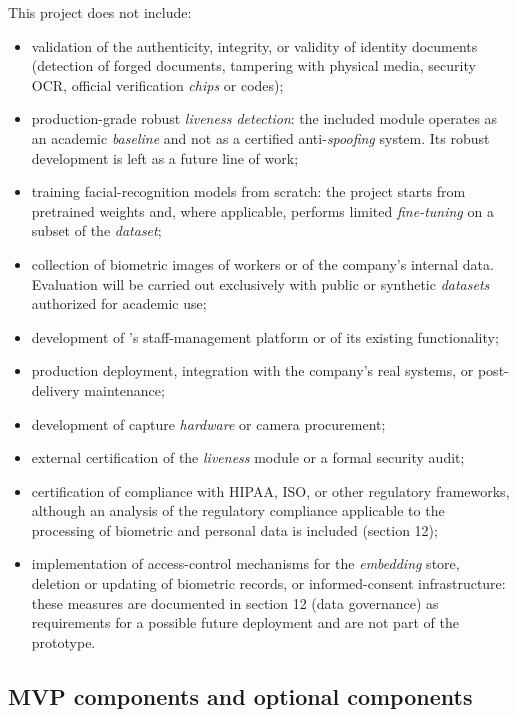 \documentclass[
  11pt, %
]{charter}
\begin{document}
This project does not include:

\begin{itemize}
  \item validation of the authenticity, integrity, or validity of identity documents (detection of forged documents, tampering with physical media, security OCR, official verification \textit{chips} or codes);
  \item production-grade robust \textit{liveness detection}: the included module operates as an academic \textit{baseline} and not as a certified anti-\textit{spoofing} system. Its robust development is left as a future line of work;
  \item training facial-recognition models from scratch: the project starts from pretrained weights and, where applicable, performs limited \textit{fine-tuning} on a subset of the \textit{dataset};
  \item collection of biometric images of workers or of the company's internal data. Evaluation will be carried out exclusively with public or synthetic \textit{datasets} authorized for academic use;
  \item development of \empclientename's\hspace{1px} staff-management platform or of its existing functionality;
  \item production deployment, integration with the company's real systems, or post-delivery maintenance;
  \item development of capture \textit{hardware} or camera procurement;
  \item external certification of the \textit{liveness} module or a formal security audit;
  \item certification of compliance with HIPAA, ISO, or other regulatory frameworks, although an analysis of the regulatory compliance applicable to the processing of biometric and personal data is included (section 12);
  \item implementation of access-control mechanisms for the \textit{embedding} store, deletion or updating of biometric records, or informed-consent infrastructure: these measures are documented in section 12 (data governance) as requirements for a possible future deployment and are not part of the prototype.
\end{itemize}

\subsection{MVP components and optional components}
\end{document}
